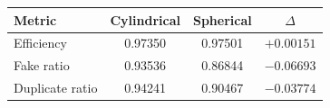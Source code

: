 \renewcommand{\arraystretch}{1.4}
\begin{tabular}{lccc}
\toprule
Metric & Cylindrical & Spherical & $\Delta$ \\
\midrule
Efficiency & 0.97350 & 0.97501 & $+0.00151$ \\
\rowcolor{gray!15}
Fake ratio & 0.93536 & 0.86844 & $-0.06693$ \\
Duplicate ratio & 0.94241 & 0.90467 & $-0.03774$ \\
\bottomrule
\end{tabular}
